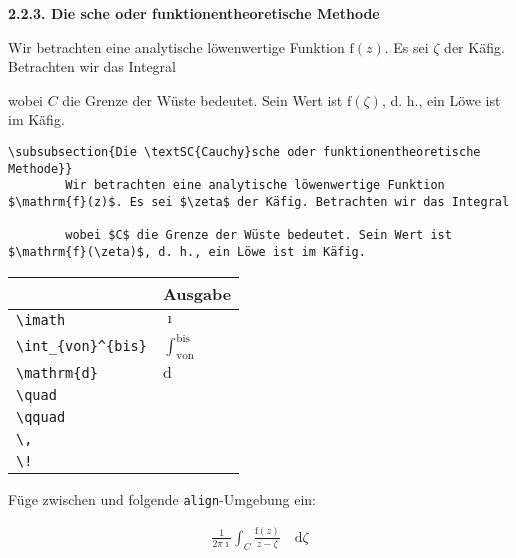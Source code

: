 \documentclass["WS\space 16-17\space -\space LaTeX-Kurs\space -\space Praesentation\space -\space 1.tex"]{subfiles}
\begin{document}
\begin{frame}[fragile]
	\Losung
	\begin{outputbox}
		{ \large\textbf{2.2.3. Die  sche oder funktionentheoretische Methode}}
		
		Wir betrachten eine analytische löwenwertige Funktion $\mathrm{f}(z)$. Es sei $\zeta$ der Käfig. Betrachten wir das Integral
		
	    wobei $C$ die Grenze der Wüste bedeutet. Sein Wert ist $\mathrm{f}(\zeta)$, d. h., ein Löwe ist im Käfig.
    \end{outputbox}

	\Code
	\begin{lstlisting}[gobble=4]
    \subsubsection{Die \textSC{Cauchy}sche oder funktionentheoretische Methode}}
		Wir betrachten eine analytische löwenwertige Funktion $\mathrm{f}(z)$. Es sei $\zeta$ der Käfig. Betrachten wir das Integral
		
		wobei $C$ die Grenze der Wüste bedeutet. Sein Wert ist $\mathrm{f}(\zeta)$, d. h., ein Löwe ist im Käfig.
	\end{lstlisting}
\end{frame}
\begin{frame}[fragile]
	\begin{center}
		\begin{tabular}{ll}
			\toprule
			\color{math-cmd}{Mathe}\color{black}{-Befehl}							&	Ausgabe					\\ \midrule
			\lstinline|\imath|				&	$\imath$					\\
			\lstinline|\int_{von}^{bis}|		&	$\int_{\mathrm{von}}^{\mathrm{bis}}$		\\ \addlinespace[0.5em]
			\lstinline|\mathrm{d}|		&	$\mathrm{d}$		
		    \\ 			
		    \lstinline|\quad|		&	$\quad$		
	        \\ 
			\lstinline|\qquad|		&	$\qquad$		
			\\
			\lstinline|\,|					&	$\,$		\\
			\lstinline|\!|					&	$\!$		\\
			\bottomrule
		\end{tabular}
	\end{center}
	\pause\btVFill
	\Aufgabee
		Füge zwischen  und  folgende \lstinline[basicstyle=\normalfont\normalsize]|align|-Umgebung ein:
	\begin{outputbox}
	    \begin{align}
		    \frac{1}{2 \pi \imath} \int_C \frac{\mathrm{f}(z)}{z - \zeta} \quad \! \! \mathrm{d} \zeta \tag{5}
	    \end{align}	
	\end{outputbox}
	\vspace{0.2cm}
\end{frame}
\end{document}
